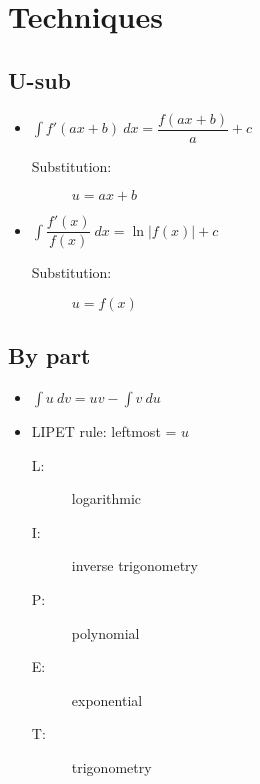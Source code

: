 \section{Techniques}
\subsection{U-sub}
\begin{itemize}
    \item $\int f'(ax+b) \: dx = \dfrac{f(ax+b)}{a}+c$
          \begin{description}
              \item[Substitution:] $u=ax+b$
          \end{description}
    \item $\int \dfrac{f'(x)}{f(x)} \: dx = \ln |f(x)|+c$
          \begin{description}
              \item[Substitution:] $u=f(x)$
          \end{description}
\end{itemize}
\subsection{By part}
\begin{itemize}
    \item $\int u \: dv = uv - \int v \: du$
    \item LIPET rule: leftmost = $u$
        \begin{description}
            \item[L:] logarithmic
            \item[I:] inverse trigonometry
            \item[P:] polynomial
            \item[E:] exponential
            \item[T:] trigonometry
        \end{description}
\end{itemize}